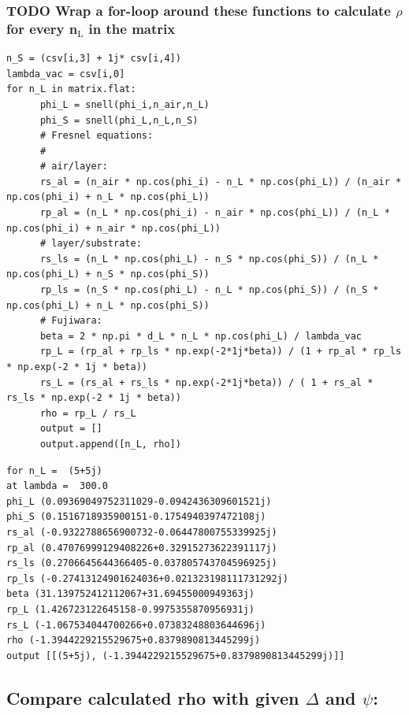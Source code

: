 \documentclass[11pt]{article}
\begin{document}
\subsubsection{{\bfseries\sffamily TODO} Wrap a for-loop around these functions to calculate \(\rho\) for every n\(_{\text{L}}\) in the matrix}
\label{sec:org198c2e1}
\begin{verbatim}
n_S = (csv[i,3] + 1j* csv[i,4])
lambda_vac = csv[i,0]
for n_L in matrix.flat:
      phi_L = snell(phi_i,n_air,n_L)
      phi_S = snell(phi_L,n_L,n_S)
      # Fresnel equations:
      #
      # air/layer:
      rs_al = (n_air * np.cos(phi_i) - n_L * np.cos(phi_L)) / (n_air * np.cos(phi_i) + n_L * np.cos(phi_L))
      rp_al = (n_L * np.cos(phi_i) - n_air * np.cos(phi_L)) / (n_L * np.cos(phi_i) + n_air * np.cos(phi_L))
      # layer/substrate:
      rs_ls = (n_L * np.cos(phi_L) - n_S * np.cos(phi_S)) / (n_L * np.cos(phi_L) + n_S * np.cos(phi_S))
      rp_ls = (n_S * np.cos(phi_L) - n_L * np.cos(phi_S)) / (n_S * np.cos(phi_L) + n_L * np.cos(phi_S))
      # Fujiwara:
      beta = 2 * np.pi * d_L * n_L * np.cos(phi_L) / lambda_vac
      rp_L = (rp_al + rp_ls * np.exp(-2*1j*beta)) / (1 + rp_al * rp_ls * np.exp(-2 * 1j * beta)) 
      rs_L = (rs_al + rs_ls * np.exp(-2*1j*beta)) / ( 1 + rs_al * rs_ls * np.exp(-2 * 1j * beta))   
      rho = rp_L / rs_L
      output = []
      output.append([n_L, rho])
\end{verbatim}


\begin{verbatim}
for n_L =  (5+5j)
at lambda =  300.0
phi_L (0.09369049752311029-0.0942436309601521j)
phi_S (0.1516718935900151-0.1754940397472108j)
rs_al (-0.9322788656900732-0.06447800755339925j)
rp_al (0.47076999129408226+0.32915273622391117j)
rs_ls (0.2706645644366405-0.037805743704596925j)
rp_ls (-0.27413124901624036+0.021323198111731292j)
beta (31.139752412112067+31.69455000949363j)
rp_L (1.426723122645158-0.9975355870956931j)
rs_L (-1.067534044700266+0.07383248803644696j)
rho (-1.3944229215529675+0.8379890813445299j)
output [[(5+5j), (-1.3944229215529675+0.8379890813445299j)]]
\end{verbatim}

\subsection{Compare calculated rho with given \(\Delta\) and \(\psi\):}
\label{sec:orgb28adba}
\end{document}
